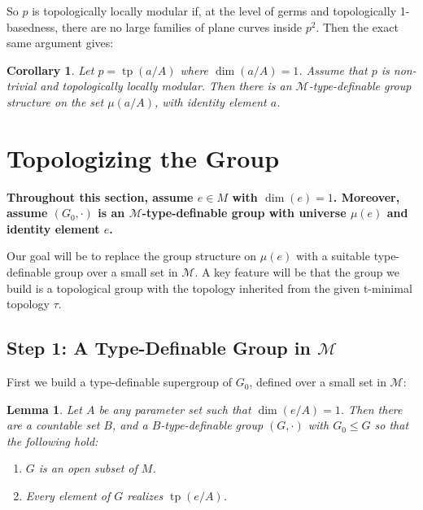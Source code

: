 \documentclass{amsart}
\newtheorem{lemma}[theorem]{Lemma}
\newtheorem{corollary}[theorem]{Corollary}
\theoremstyle{definition}
\newcommand{\tp}{\operatorname{tp}}
\begin{document}
So $p$ is topologically locally modular if, at the level of germs and topologically 1-basedness, there are no large families of plane curves inside $p^2$. Then the exact same argument gives:

\begin{corollary}\label{C: loc mod gp}
    Let $p=\tp(a/A)$ where $\dim(a/A)=1$. Assume that $p$ is non-trivial and topologically locally modular. Then there is an $\mathcal M$-type-definable group structure on the set $\mu(a/A)$, with identity element $a$. 
\end{corollary}

\section{Topologizing the Group}

\textbf{Throughout this section, assume $e\in M$ with $\dim(e)=1$. Moreover, assume $(G_0,\cdot)$ is an $\mathcal M$-type-definable group with universe $\mu(e)$ and identity element $e$.} 

Our goal will be to replace the group structure on $\mu(e)$ with a suitable type-definable group over a small set in $\mathcal M$. A key feature will be that the group we build is a topological group with the topology inherited from the given t-minimal topology $\tau$.

\subsection{Step 1: A Type-Definable Group in $\mathcal M$}

First we build a type-definable supergroup of $G_0$, defined over a small set in $\mathcal M$:

\begin{lemma}\label{L: open supergroup}
    Let $A$ be any parameter set such that $\dim(e/A)=1$. Then there are a countable set $B$, and a $B$-type-definable group $(G,\cdot)$ with $G_0\leq G$ so that the following hold:
    \begin{enumerate}
        \item $G$ is an open subset of $M$.
        \item Every element of $G$ realizes $\tp(e/A)$.
    \end{enumerate}
\end{lemma}
\end{document}
